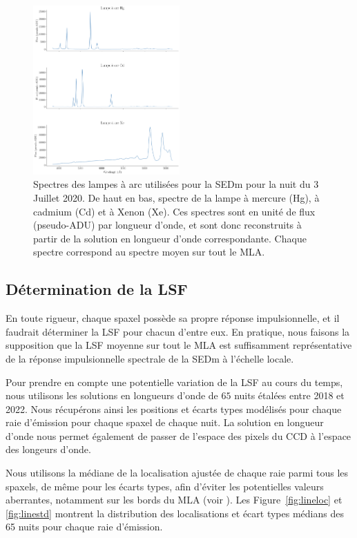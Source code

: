\documentclass[../main/main.tex]{subfiles}
\begin{document}
\begin{figure}[h!]
  \centering
  \includegraphics[width=0.5\textwidth]{../figures/06_irf/arclamps.png}
  \caption[Spectres des lampes à arc utilisées pour la SEDm]{Spectres
    des lampes à arc utilisées pour la SEDm pour la nuit du 3 Juillet
    2020. De haut en bas, spectre de la lampe à mercure (Hg), à cadmium
    (Cd) et à Xenon (Xe). Ces spectres sont en unité de flux
    (pseudo-ADU) par longueur d'onde, et sont donc reconstruits à partir
  de la solution en longueur d'onde correspondante. Chaque spectre
  correspond au spectre moyen sur tout le MLA.}
  \label{fig:arclamps}
\end{figure}

\subsection{Détermination de la LSF}

En toute rigueur, chaque spaxel possède sa propre réponse
impulsionnelle, et il faudrait déterminer la LSF pour chacun d'entre
eux. En pratique, nous faisons la supposition que la LSF moyenne sur
tout le MLA est suffisamment représentative de la réponse impulsionnelle
spectrale de la SEDm à l'échelle locale.

Pour prendre en compte une potentielle variation de la LSF au cours du
temps, nous utilisons les solutions en longueurs d'onde de $65$ nuits
étalées entre 2018 et 2022. Nous récupérons ainsi les positions et
écarts types modélisés pour chaque raie d'émission pour chaque spaxel de
chaque nuit. La solution en longueur d'onde nous permet également de
passer de l'espace des pixels du CCD à l'espace des longeurs d'onde.

Nous utilisons la médiane de la localisation ajustée de chaque raie
parmi tous les
spaxels, de même pour les écarts types, afin d'éviter les potentielles
valeurs aberrantes, notamment sur les bords du MLA (voir \citet{pysedm}). Les Figure~\ref{fig:lineloc} et
\ref{fig:linestd} montrent la distribution des localisations et écart
types médians des 65 nuits pour chaque raie d'émission.
\end{document}
